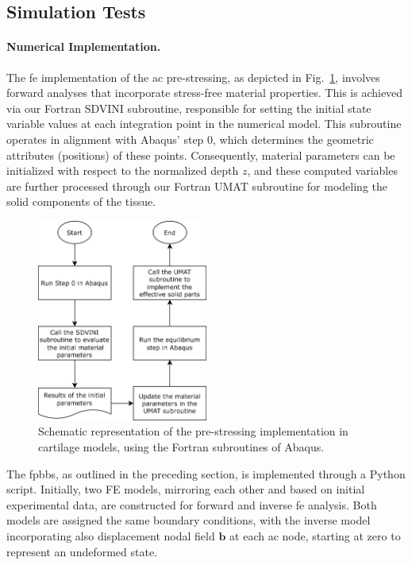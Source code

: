\subsection{Simulation Tests}\label{section:simulation_fe}

\paragraph{Numerical Implementation.} The \ac{fe} implementation of the \ac{ac} pre-stressing, as depicted in Fig.~\ref{fig:psa_subroutines}, involves forward analyses that incorporate stress-free material properties. This is achieved via our Fortran SDVINI subroutine, responsible for setting the initial state variable values at each integration point in the numerical model. This subroutine operates in alignment with Abaqus' step 0, which determines the geometric attributes (positions) of these points. Consequently, material parameters can be initialized with respect to the normalized depth $z$, and these computed variables are further processed through our Fortran UMAT subroutine for modeling the solid components of the tissue.

\begin{figure}[t]\centering
\includegraphics[width=0.5\textwidth]{img/psa_subroutines.png}
\caption{Schematic representation of the pre-stressing implementation in cartilage models, using the Fortran subroutines of Abaqus.}
\label{fig:psa_subroutines}
\end{figure}

The \ac{fpbbs}, as outlined in the preceding section, is implemented through a Python script. Initially, two FE models, mirroring each other and based on initial experimental data, are constructed for forward and inverse \ac{fe} analysis. Both models are assigned the same boundary conditions, with the inverse model incorporating also displacement nodal field $\mathbf{b}$ at each \ac{ac} node, starting at zero to represent an undeformed state.

